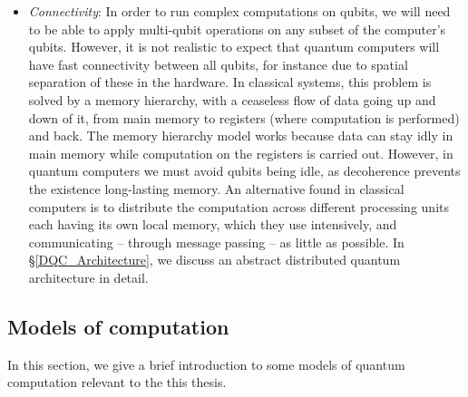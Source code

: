 \begin{itemize}
\item \textit{Connectivity}: In order to run complex computations on qubits, we will need to be able to apply multi-qubit operations on any subset of the computer's qubits. However, it is not realistic to expect that quantum computers will have fast connectivity between all qubits, for instance due to spatial separation of these in the hardware. In classical systems, this problem is solved by a memory hierarchy, with a ceaseless flow of data going up and down of it, from main memory to registers (where computation is performed) and back. The memory hierarchy model works because data can stay idly in main memory while computation on the registers is carried out. However, in quantum computers we must avoid qubits being idle, as decoherence prevents the existence long-lasting memory. An alternative found in classical computers is to distribute the computation across different processing units each having its own local memory, which they use intensively, and communicating -- through message passing -- as little as possible. In \S\ref{DQC_Architecture}, we discuss an abstract distributed quantum architecture in detail.

\end{itemize}


\subsection{Models of computation}
\label{Models}

In this section, we give a brief introduction to some models of quantum computation relevant to the this thesis.

